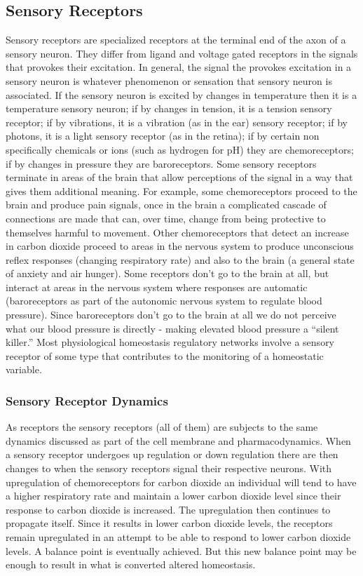 \subsection{Sensory Receptors}

Sensory receptors are specialized receptors at the terminal end of the axon of a sensory neuron. They differ from ligand and voltage gated receptors in the signals that provokes their excitation. In general, the signal the provokes excitation in a sensory neuron is whatever phenomenon or sensation that sensory neuron is associated. If the sensory neuron is excited by changes in temperature then it is a temperature sensory neuron; if by changes in tension, it is a tension sensory receptor; if by vibrations, it is a vibration (as in the ear) sensory receptor; if by photons, it is a light sensory receptor (as in the retina); if by certain non specifically chemicals or ions (such as hydrogen for pH) they are chemoreceptors; if by changes in pressure they are baroreceptors. Some sensory receptors terminate in areas of the brain that allow perceptions of the signal in a way that gives them additional meaning. For example, some chemoreceptors proceed to the brain and produce pain signals, once in the brain a complicated cascade of connections are made that can, over time, change from being protective to themselves harmful to movement. Other chemoreceptors that detect an increase in carbon dioxide proceed to areas in the nervous system to produce unconscious reflex responses (changing respiratory rate) and also to the brain (a general state of anxiety and air hunger). Some receptors don’t go to the brain at all, but interact at areas in the nervous  system where responses are automatic (baroreceptors as part of the autonomic nervous system to regulate blood pressure). Since baroreceptors don’t go to the brain at all we do not perceive what our blood pressure is directly - making elevated blood pressure a “silent killer.” Most physiological  homeostasis regulatory networks involve a sensory receptor of some type that contributes to the monitoring of a homeostatic variable. 

\subsubsection{Sensory Receptor Dynamics}
As receptors the sensory receptors (all of them) are subjects to the same dynamics discussed as part of the cell membrane and pharmacodynamics. When a sensory receptor undergoes up regulation or down regulation there are then changes to when the sensory receptors signal their respective neurons. With upregulation of chemoreceptors for carbon dioxide an individual will tend to have a higher respiratory rate and maintain a lower carbon dioxide level since their response to carbon dioxide is increased. The upregulation then continues to propagate itself. Since it results in lower carbon dioxide levels, the receptors remain upregulated in an attempt to be able to respond to lower carbon dioxide levels. A balance point is eventually achieved. But this new balance point may be enough to result in what is converted altered homeostasis.

